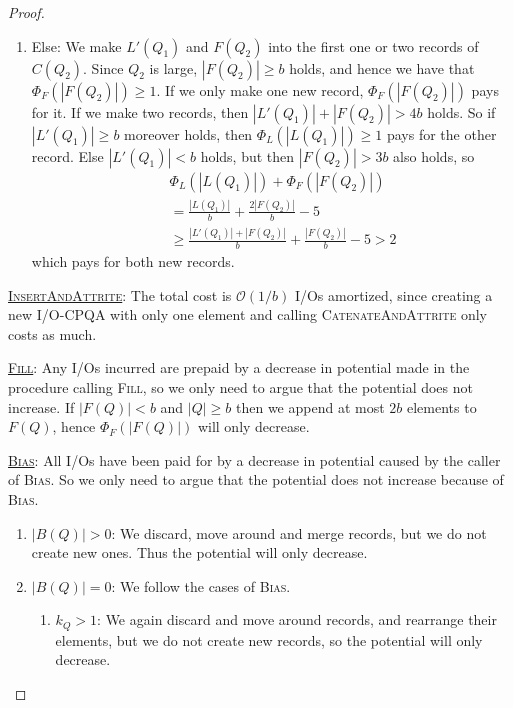 \documentclass{sig-alternate}
\newcommand{\bigO}{\mathcal{O}}
\renewcommand{\(}{\left(}
\renewcommand{\)}{\right)}
\begin{document}
\begin{proof}
\begin{fullenv}
\begin{enumerate}
  \item Else: We make $L'(Q_1)$ and $F(Q_2)$ into the first one or two records
    of $C(Q_2)$. Since $Q_2$ is large, $|F(Q_2)| \geq b$ holds, and hence we
    have that $\Phi_F(|F(Q_2)|) \geq 1$. If we only make one new record,
    $\Phi_F(|F(Q_2)|)$ pays for it. If we make two records, then $|L'(Q_1)| +
    |F(Q_2)| > 4b$ holds. So if $|L'(Q_1)| \geq b$ moreover holds, then
    $\Phi_L(|L(Q_1)|) \geq 1$ pays for the other record. Else $|L'(Q_1)| < b$
    holds, but then $|F(Q_2)| > 3b$ also holds, so
    \begin{eqnarray*}
      && \Phi_L(|L(Q_1)|) + \Phi_F(|F(Q_2)|) \\
      && =
       \frac{|L(Q_1)|}{b} + \frac{2|F(Q_2)|}{b} - 5 \\
      && \geq
      \frac{|L'(Q_1)|+|F(Q_2)|}{b} + \frac{|F(Q_2)|}{b} - 5
      >
      2
    \end{eqnarray*}
    which pays for both new records.
\end{enumerate}

\noindent \underline{\textsc{InsertAndAttrite}}: The total cost is $\bigO(1/b)$
I/Os amortized, since creating a new I/O-CPQA with only one element and calling
\textsc{CatenateAndAttrite} only costs as much.

\noindent \underline{\textsc{Fill}}: Any I/Os incurred are prepaid by a decrease
in potential made in the procedure calling \textsc{Fill}, so we only need to
argue that the potential does not increase. If $|F(Q)| < b$ and $|Q| \geq b$
then we append at most $2b$ elements to $F(Q)$, hence $\Phi_F(|F(Q)|)$ will only
decrease.

\noindent \underline{\textsc{Bias}}: All I/Os have been paid for by a decrease
in potential caused by the caller of \textsc{Bias}. So we only need to argue
that the potential does not increase because of \textsc{Bias}.
\begin{enumerate}
  \item $|B(Q)| > 0$: We discard, move around and merge records, but we do not
    create new ones. Thus the potential will only decrease.

  \item $|B(Q)| = 0$: We follow the cases of \textsc{Bias}.
  \begin{enumerate}[label=\arabic*)]
    \item $k_Q > 1$: We again discard and move around records, and rearrange
      their elements, but we do not create new records, so the potential will
      only decrease.


\end{enumerate}
\end{enumerate}
\end{fullenv}
\end{proof}
\end{document}
